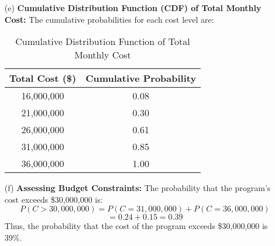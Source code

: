 \documentclass{article}
\begin{document}
\begin{enumerate}
    \item[(e)] \textbf{Cumulative Distribution Function (CDF) of Total Monthly Cost:}  
    The cumulative probabilities for each cost level are:

    \begin{table}[H]
    \centering
    \begin{tabular}{c|c}
        \hline
        \textbf{Total Cost (\$)} & \textbf{Cumulative Probability} \\
        \hline
        16,000,000 & 0.08 \\
        21,000,000 & 0.30 \\
        26,000,000 & 0.61 \\
        31,000,000 & 0.85 \\
        36,000,000 & 1.00 \\
        \hline
    \end{tabular}
    \caption{Cumulative Distribution Function of Total Monthly Cost}
    \end{table}

    \item[(f)] \textbf{Assessing Budget Constraints:}  
    The probability that the program’s cost exceeds \$30,000,000 is:
    \[
    P(C > 30,000,000) = P(C = 31,000,000) + P(C = 36,000,000)
    \]
    \[
    = 0.24 + 0.15 = 0.39
    \]
    Thus, the probability that the cost of the program exceeds \$30,000,000 is 39\%.

\end{enumerate}
\end{document}
